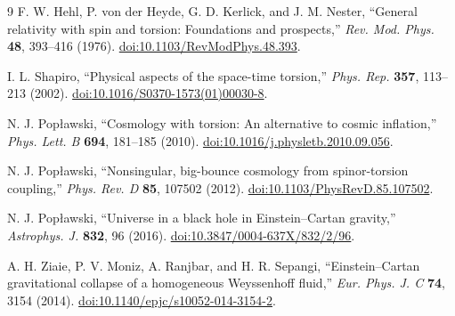 \documentclass[11pt]{article}
\begin{document}
\begin{thebibliography}{9}
F. W. Hehl, P. von der Heyde, G. D. Kerlick, and J. M. Nester,
``General relativity with spin and torsion: Foundations and prospects,''
\emph{Rev. Mod. Phys.} \textbf{48}, 393--416 (1976).
\href{https://doi.org/10.1103/RevModPhys.48.393}{doi:10.1103/RevModPhys.48.393}.

I. L. Shapiro,
``Physical aspects of the space-time torsion,''
\emph{Phys. Rep.} \textbf{357}, 113--213 (2002).
\href{https://doi.org/10.1016/S0370-1573(01)00030-8}{doi:10.1016/S0370-1573(01)00030-8}.

N. J. Pop\l{}awski,
``Cosmology with torsion: An alternative to cosmic inflation,''
\emph{Phys. Lett. B} \textbf{694}, 181--185 (2010).
\href{https://doi.org/10.1016/j.physletb.2010.09.056}{doi:10.1016/j.physletb.2010.09.056}.

N. J. Pop\l{}awski,
``Nonsingular, big-bounce cosmology from spinor-torsion coupling,''
\emph{Phys. Rev. D} \textbf{85}, 107502 (2012).
\href{https://doi.org/10.1103/PhysRevD.85.107502}{doi:10.1103/PhysRevD.85.107502}.

N. J. Pop\l{}awski,
``Universe in a black hole in Einstein--Cartan gravity,''
\emph{Astrophys. J.} \textbf{832}, 96 (2016).
\href{https://doi.org/10.3847/0004-637X/832/2/96}{doi:10.3847/0004-637X/832/2/96}.

A. H. Ziaie, P. V. Moniz, A. Ranjbar, and H. R. Sepangi,
``Einstein--Cartan gravitational collapse of a homogeneous Weyssenhoff fluid,''
\emph{Eur. Phys. J. C} \textbf{74}, 3154 (2014).
\href{https://doi.org/10.1140/epjc/s10052-014-3154-2}{doi:10.1140/epjc/s10052-014-3154-2}.

\end{thebibliography}
\end{document}
